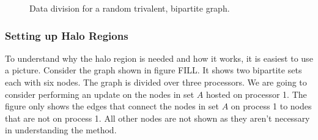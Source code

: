 \documentclass[pdftex,12pt,a4paper]{article}
\begin{document}
\begin{figure}
\begin{center}
\caption{Data division for a random trivalent, bipartite graph.}
\end{center}
\end{figure}






\subsubsection{Setting up Halo Regions}

To understand why the halo region is needed and how it works, it is easiest to use a picture. Consider the graph shown in figure FILL. It shows two bipartite sets each with six nodes. The graph is divided over three processors. We are going to consider performing an update on the nodes in set $A$ hosted on processor 1. The figure only shows the edges that connect the nodes in set $A$ on process 1 to nodes that are not on process 1. All other nodes are not shown as they aren't necessary in understanding the method.
\end{document}
